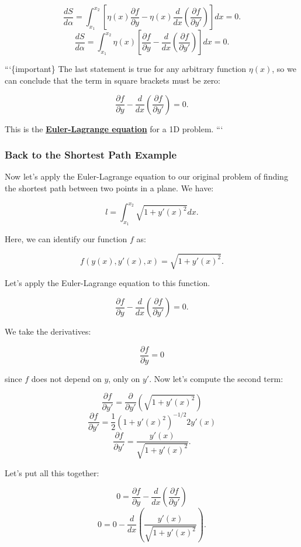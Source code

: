 \documentclass[11pt]{article}
\begin{document}
\[\dfrac{dS}{d\alpha} = \int_{x_1}^{x_2}\left[ \eta(x)\dfrac{\partial f}{\partial y} - \eta(x) \dfrac{d}{dx}\left( \dfrac{\partial f}{\partial y'} \right) \right] dx = 0.\]
\[\dfrac{dS}{d\alpha} = \int_{x_1}^{x_2} \eta(x) \left[ \dfrac{\partial f}{\partial y} - \dfrac{d}{dx}\left( \dfrac{\partial f}{\partial y'} \right) \right] dx = 0.\]

```\{important\} The last statement is true for any arbitrary function
\(\eta(x)\), so we can conclude that the term in square brackets must be
zero:

\[\dfrac{\partial f}{\partial y} - \dfrac{d}{dx}\left( \dfrac{\partial f}{\partial y'} \right) = 0.\]

This is the
\textbf{\href{https://en.wikipedia.org/wiki/Euler\%E2\%80\%93Lagrange_equation}{Euler-Lagrange
equation}} for a 1D problem. ```

    \subsubsection{Back to the Shortest Path
Example}\label{back-to-the-shortest-path-example}

Now let's apply the Euler-Lagrange equation to our original problem of
finding the shortest path between two points in a plane. We have:

\[l = \int_{x_1}^{x_2} \sqrt{1 + y'(x)^2} dx.\]

Here, we can identify our function \(f\) as:

\[f(y(x), y'(x), x) = \sqrt{1 + y'(x)^2}.\]

Let's apply the Euler-Lagrange equation to this function.

\[\dfrac{\partial f}{\partial y} - \dfrac{d}{dx}\left( \dfrac{\partial f}{\partial y'} \right) = 0.\]

We take the derivatives:

\[\dfrac{\partial f}{\partial y} = 0\]

since \(f\) does not depend on \(y\), only on \(y'\). Now let's compute
the second term:

\[\dfrac{\partial f}{\partial y'} = \dfrac{\partial}{\partial y'}\left( \sqrt{1 + y'(x)^2} \right)\]
\[\dfrac{\partial f}{\partial y'} = \dfrac{1}{2} \left(1 + y'(x)^2\right)^{-1/2} 2y'(x)\]
\[\dfrac{\partial f}{\partial y'} = \frac{y'(x)}{\sqrt{1 + y'(x)^2}}.\]

Let's put all this together:

\[0 = \dfrac{\partial f}{\partial y} - \dfrac{d}{dx}\left( \dfrac{\partial f}{\partial y'} \right)\]
\[0 = 0 - \dfrac{d}{dx}\left(\frac{y'(x)}{\sqrt{1 + y'(x)^2}}\right).\]
\end{document}
